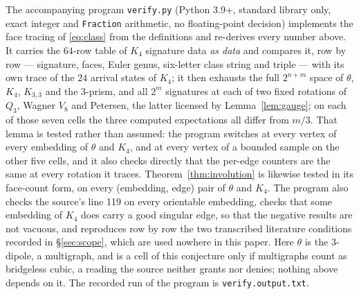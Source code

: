 \documentclass[11pt]{amsart}
\begin{document}
The accompanying program \texttt{verify.py} (Python 3.9+, standard library
only, exact integer and \texttt{Fraction} arithmetic, no floating-point
decision) implements the face tracing of \eqref{eq:class} from the definitions
and re-derives every number above. It carries the $64$-row table of $K_4$
signature data \emph{as data} and compares it, row by row --- signature,
faces, Euler genus, six-letter class string and triple --- with its own trace
of the $24$ arrival states of $K_4$; it then exhausts the full $2^{n+m}$ space
of $\theta$, $K_4$, $K_{3,3}$ and the $3$-prism, and all $2^{m}$ signatures at
each of two fixed rotations of $Q_3$, Wagner $V_8$ and Petersen, the latter
licensed by Lemma~\ref{lem:gauge}; on each of those seven cells the three
computed expectations all differ from $m/3$. That lemma is tested rather than
assumed:
the program switches at every vertex of every embedding of $\theta$ and $K_4$,
and at every vertex of a bounded sample on the other five cells, and it also
checks directly that the per-edge counters are the same at every rotation it
traces. Theorem~\ref{thm:involution} is likewise tested in its face-count form,
on every (embedding, edge) pair of $\theta$ and $K_4$. The program also
checks the source's line 119 on every orientable embedding, checks
that some embedding of $K_4$ does carry a good singular edge, so that the
negative results are not vacuous, and reproduces row by row the two
transcribed literature conditions recorded in \S\ref{sec:scope}, which are
used nowhere in this paper. Here $\theta$ is the $3$-dipole, a
multigraph, and is a cell of this conjecture only if multigraphs count as
bridgeless cubic, a reading the source neither grants nor denies; nothing above
depends on it. The recorded run of the program is \texttt{verify.output.txt}.
\end{document}
